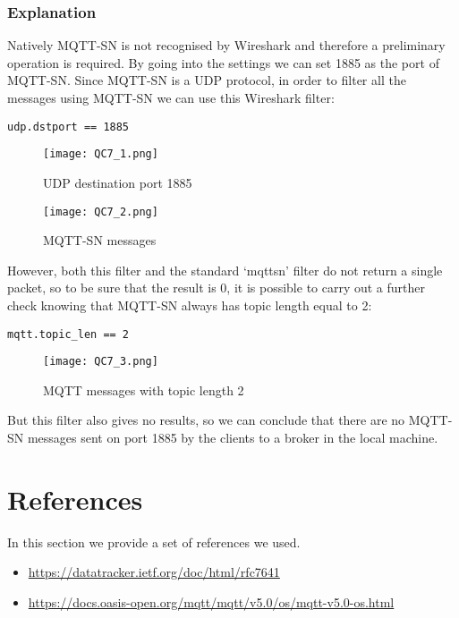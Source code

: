 \subsubsection{Explanation}
Natively MQTT-SN is not recognised by Wireshark and therefore a preliminary operation is required. By going into the settings we can set 1885 as the port of MQTT-SN.
Since MQTT-SN is a UDP protocol, in order to filter all the messages using MQTT-SN we can use this Wireshark filter:
\begin{verbatim}
udp.dstport == 1885
\end{verbatim}
\begin{figure}[H]
    \centering
    \texttt{[image: QC7\_1.png]}
    \caption{UDP destination port 1885}
\end{figure}
\begin{figure}[H]
    \centering
    \texttt{[image: QC7\_2.png]}
    \caption{MQTT-SN messages}
\end{figure}
However, both this filter and the standard ‘mqttsn’ filter do not return a single packet, so to be sure that the result is 0, it is possible to carry out a further check knowing that MQTT-SN always has topic length equal to 2:
\begin{verbatim}
mqtt.topic_len == 2
\end{verbatim}
\begin{figure}[H]
    \centering
    \texttt{[image: QC7\_3.png]}
    \caption{MQTT messages with topic length 2}
\end{figure}
But this filter also gives no results, so we can conclude that there are no MQTT-SN messages sent on port 1885 by the clients to a broker in the local machine.

\section{References}
In this section we provide a set of references we used.
\begin{itemize}
	\item \url{https://datatracker.ietf.org/doc/html/rfc7641}
	\item \url{https://docs.oasis-open.org/mqtt/mqtt/v5.0/os/mqtt-v5.0-os.html}
\end{itemize}
























